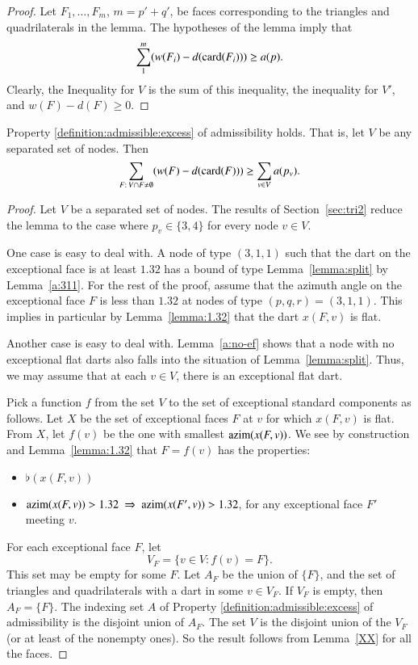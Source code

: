 \begin{proof}  Let $F_1,\ldots,F_m$, $m={p'+q'}$, be faces corresponding
to the triangles and quadrilaterals in the lemma.  The hypotheses
of the lemma imply that
    $$\sum_{1}^{m} (w(F_i) - d({\operatorname{card}}(F_i))) \ge a(p).$$
Clearly, the Inequality for $V$ is the sum of this inequality, the
inequality for $V'$, and $w(F)- d(F)\ge0$.
\end{proof}


\begin{lemma}  Property \ref{definition:admissible:excess}  of
admissibility holds.  That is, let $V$ be any separated set of
nodes. Then
        $$\sum_{F:\,V\cap F\ne\emptyset} (w(F) -d({\operatorname{card}}(F)))
            \ge \sum_{v\in V} a(p_v).$$
\end{lemma}

\begin{proof}  Let $V$ be a separated set of nodes.
The results of Section~\ref{sec:tri2} reduce the lemma to the case
where $p_v\in\{3,4\}$ for every node $v\in V$.


One case is easy to deal with.  A node of type $(3,1,1)$ such
that the dart on the exceptional face is at least $1.32$ has a
bound of type Lemma~\ref{lemma:split} by Lemma~\ref{a:311}.
For the rest of the proof, assume that the azimuth angle on
the exceptional face $F$ is less than $1.32$ at nodes of type
$(p,q,r)=(3,1,1)$. This implies in particular by
Lemma~\ref{lemma:1.32} that the dart $x(F,v)$ is flat.

Another case is easy to deal with.  Lemma~\ref{a:no-ef}
shows that a node with no exceptional flat darts also
falls into the situation of Lemma~\ref{lemma:split}.
Thus, we may assume that at each $v\in V$, there is an exceptional
flat dart.

Pick a function $f$ from the set $V$ to the set of exceptional
standard components as follows. Let $X$ be the set of exceptional faces
$F$ at $v$ for which $x(F,v)$ is flat.  From $X$, let $f(v)$ be the
one with smallest ${\operatorname{azim}}(x(F,v))$.  We see by construction and
Lemma~\ref{lemma:1.32} that $F = f(v)$ has the properties:
    \begin{itemize}
        \item $\flat(x(F,v))$
        \item $\azim(x(F,v)) > 1.32\ \Rightarrow\ \azim(x(F',v)) >
        1.32$, for any exceptional face $F'$ meeting $v$.
    \end{itemize}

For each exceptional face $F$, let
    $$V_F = \{ v\in V : f(v) = F\}.$$  This set may be empty for
some $F$.  Let $A_F$ be the union of $\{F\}$, and the set of
triangles and quadrilaterals with a dart in some $v\in V_F$.  If
$V_F$ is empty, then $A_F =\{F\}$.  The indexing set $A$ of Property
\ref{definition:admissible:excess} of admissibility is the disjoint
union of $A_F$.  The set $V$ is the disjoint union of the $V_F$ (or
at least of the nonempty ones). So the result follows from
Lemma~\ref{XX} for all the faces.
\end{proof}



